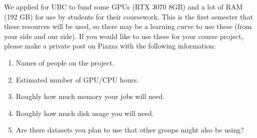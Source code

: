 \documentclass{article}
\def\enum#1{\begin{enumerate}#1\end{enumerate}}
\begin{document}
We applied for UBC to fund some GPUs (RTX 3070 8GB) and a lot of RAM (192 GB) for use by students for their coursework. This is the first semester that these resources will be used, so there may be a learning curve to use these (from your side and our side). If you would like to use these for your course project, please make a private post on Piazza with the following information:
\enum{
\item Names of people on the project.
\item Estimated number of GPU/CPU hours.
\item Roughly how much memory your jobs will need.
\item Roughly how much disk usage you will need.
\item Are there datasets you plan to use that other groups might also be using?
}
\end{document}
